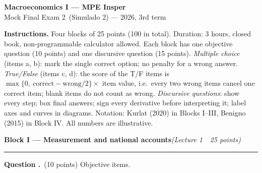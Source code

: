 \documentclass[11pt,a4paper]{article}
\newif\ifsolucoes
\newcommand{\disciplina}{Macroeconomics I --- MPE Insper}
\newcommand{\listatema}{Mock Final Exam 2}
\newcounter{questao}
\newcommand{\bloco}[3]{\Needspace{10\baselineskip}\bigskip\noindent
  {\large\bfseries\color{blue!55!black}Block #1 --- #2}\hfill\textit{(#3)}\par
  \noindent\rule{\linewidth}{0.3pt}\smallskip}
\newcommand{\questao}[1]{\refstepcounter{questao}\medskip\noindent
  \textbf{Question \thequestao.}~#1\par}
\begin{document}
\begin{center}
  {\Large\bfseries \disciplina}\\[2pt]
  {\large \listatema\ (Simulado 2) --- 2026, 3rd term}\ifsolucoes\\[2pt]\textit{Solutions and Grading Rubric}\fi
\end{center}
\vspace{2pt}

{\footnotesize\noindent\textbf{Instructions.} Four blocks of 25 points (100 in total). Duration: 3 hours,
closed book, non-programmable calculator allowed. Each block has one objective question (10 points)
and one discursive question (15 points).
\emph{Multiple choice} (items a, b): mark the single correct option; no penalty for a wrong answer.
\emph{True/False} (items c, d): the score of the T/F items is
$\max\{0,\ \text{correct}-\text{wrong}/2\}\times$ item value, i.e.\ every two wrong items cancel one
correct item; blank items do not count as wrong.
\emph{Discursive questions}: show every step; box final answers; sign every derivative before
interpreting it; label axes and curves in diagrams. Notation: Kurlat (2020) in Blocks I--III, Benigno
(2015) in Block IV. All numbers are illustrative.\par}

\ifsolucoes
\medskip
{\footnotesize\noindent\textbf{How the rubric works.} Conceptual caps (``max.\ $x$ pts'') bound an
item whatever else is right. Light penalties ($-1$ pt) apply to arithmetic slips with a correct method.
Caps and penalties are \emph{not cumulative}: when a cap applies, the penalties inside it are ignored.
Each question ends with the graded mistake it retests (``Gap targeted''). Every number below is
recomputed by \texttt{simulado\_codigo/check\_simulado\_02.py}.\par}
\fi

\bloco{I}{Measurement and national accounts}{Lecture 1 \,\textbullet\, 25 points}

\questao{(10 points) Objective items.}
\end{document}
